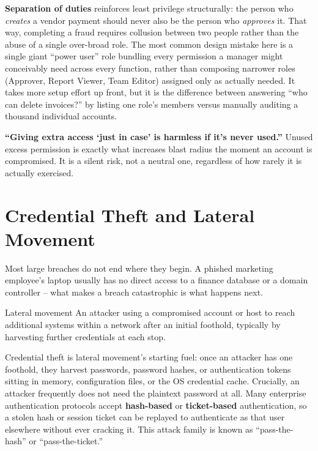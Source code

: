 \textbf{Separation of duties} reinforces least privilege structurally: the person who \emph{creates}
a vendor payment should never also be the person who \emph{approves} it. That way, completing a fraud
requires collusion between two people rather than the abuse of a single over-broad role. The most
common design mistake here is a single giant ``power user'' role bundling every permission a manager
might conceivably need across every function, rather than composing narrower roles (Approver,
Report Viewer, Team Editor) assigned only as actually needed. It takes more setup effort up front,
but it is the difference between answering ``who can delete invoices?'' by listing one role's
members versus manually auditing a thousand individual accounts.

\begin{misconception}
\textbf{``Giving extra access `just in case' is harmless if it's never used.''} Unused excess
permission is exactly what increases blast radius the moment an account is compromised. It is a
silent risk, not a neutral one, regardless of how rarely it is actually exercised.
\end{misconception}

\section{Credential Theft and Lateral Movement}

Most large breaches do not end where they begin. A phished marketing employee's laptop usually has
no direct access to a finance database or a domain controller -- what makes a breach catastrophic is
what happens next.

\begin{definition}{Lateral movement}
An attacker using a compromised account or host to reach additional systems within a network after
an initial foothold, typically by harvesting further credentials at each stop.
\end{definition}

Credential theft is lateral movement's starting fuel: once an attacker has one foothold, they
harvest passwords, password hashes, or authentication tokens sitting in memory, configuration
files, or the OS credential cache. Crucially, an attacker frequently does not need the plaintext
password at all. Many enterprise authentication protocols accept \textbf{hash-based} or
\textbf{ticket-based} authentication, so a stolen hash or session ticket can be replayed to
authenticate as that user elsewhere without ever cracking it. This attack family is known as
``pass-the-hash'' or ``pass-the-ticket.''


